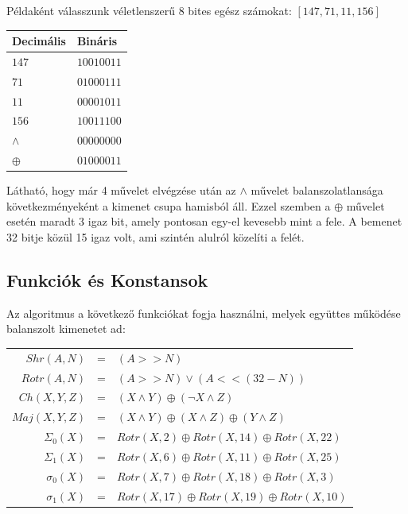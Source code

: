 Példaként válasszunk véletlenszerű 8 bites egész számokat: $[147, 71, 11, 156]$

\begin{table}[H]
\centering
    \begin{tabular}{|l|l|}
        \hline
        \textbf{Decimális} & \textbf{Bináris} \\
        \hline
        \hline
        $147$   &   $10010011$ \\
        \hline
        $71$   &   $01000111$ \\
        \hline
        $11$   &   $00001011$ \\
        \hline
        $156$   &   $10011100$ \\
        \hline
        \hline
        $\land$   &   $00000000$ \\
        \hline
        $\oplus$   &   $01000011$ \\
        \hline
    \end{tabular}
\end{table}


Látható, hogy már 4 művelet elvégzése után az $\land$ művelet balanszolatlansága következményeként a kimenet csupa hamisból áll. Ezzel szemben a $\oplus$ művelet esetén maradt 3 igaz bit, amely pontosan egy-el kevesebb mint a fele. A bemenet 32 bitje közül 15 igaz volt, ami szintén alulról közelíti a felét.




\subsection{Funkciók és Konstansok}

Az algoritmus a következő funkciókat fogja használni, melyek együttes működése balanszolt kimenetet ad:

\bigbreak

\begin{tabular}{rcl}

    $Shr(A, N)$     & = &   $(A >> N)$ \\
    $Rotr(A, N)$    & = &   $(A >> N) \lor (A << (32 - N)) $ \\
    $Ch(X, Y, Z)$   & = &   $(X \land Y) \oplus (\neg X \land Z)$ \\
    $Maj(X, Y, Z)$  & = &   $(X \land Y) \oplus (X \land Z) \oplus (Y \land Z)$ \\
    $\Sigma_0(X)$   & = &   $Rotr(X, 2)  \oplus Rotr(X, 14) \oplus Rotr(X, 22)$ \\
    $\Sigma_1(X)$   & = &   $Rotr(X, 6)  \oplus Rotr(X, 11) \oplus Rotr(X, 25)$ \\
    $\sigma_0(X)$   & = &   $Rotr(X, 7)  \oplus Rotr(X, 18) \oplus Rotr(X, 3)$  \\
    $\sigma_1(X)$   & = &   $Rotr(X, 17) \oplus Rotr(X, 19) \oplus Rotr(X, 10)$ \\

\end{tabular}


